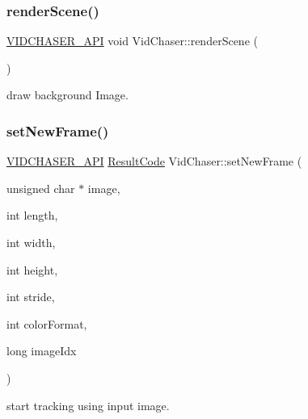 \subsubsection{\texorpdfstring{render\+Scene()}{renderScene()}}
{\footnotesize\ttfamily \hyperlink{_vid_chaser_a_p_i_8h_abe868bb94e22f611aece5087695f9ef3}{V\+I\+D\+C\+H\+A\+S\+E\+R\+\_\+\+A\+PI} void Vid\+Chaser\+::render\+Scene (\begin{DoxyParamCaption}{ }\end{DoxyParamCaption})}



draw background Image. 

\mbox{\label{namespace_vid_chaser_a1ad3852918f8e289a776bbf23dde0d15}} 
\subsubsection{\texorpdfstring{set\+New\+Frame()}{setNewFrame()}}
{\footnotesize\ttfamily \hyperlink{_vid_chaser_a_p_i_8h_abe868bb94e22f611aece5087695f9ef3}{V\+I\+D\+C\+H\+A\+S\+E\+R\+\_\+\+A\+PI} \hyperlink{namespace_vid_chaser_a9a65fd4518380d53654f1af799cbf8ed}{Result\+Code} Vid\+Chaser\+::set\+New\+Frame (\begin{DoxyParamCaption}\item[{unsigned char $\ast$}]{image,  }\item[{int}]{length,  }\item[{int}]{width,  }\item[{int}]{height,  }\item[{int}]{stride,  }\item[{int}]{color\+Format,  }\item[{long}]{image\+Idx }\end{DoxyParamCaption})}



start tracking using input image. 



